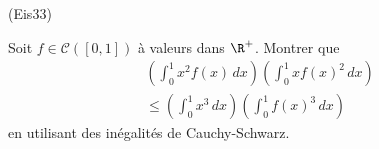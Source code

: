 \begin{tiny}(Eis33)\end{tiny} Soit $f\in \mathcal{C}([0,1])$ à valeurs dans $\R^+$. Montrer que
\begin{multline*}
 \left( \int_{0}^{1}x^2 f(x)\,dx\right) \left( \int_{0}^{1}x f(x)^2\,dx\right) \\
 \leq 
 \left( \int_{0}^{1}x^3\,dx\right) \left( \int_{0}^{1} f(x)^3\,dx\right)
\end{multline*}
en utilisant des inégalités de Cauchy-Schwarz.
